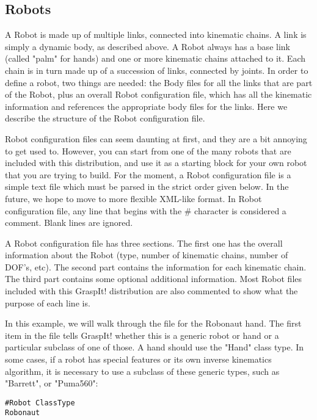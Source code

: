 \subsection{Robots}
\label{sec:robotfile}

A Robot is made up of multiple links, connected into kinematic
chains. A link is simply a dynamic body, as described above. A Robot
always has a base link (called "palm" for hands) and one or more
kinematic chains attached to it. Each chain is in turn made up of a
succession of links, connected by joints. In order to define a robot,
two things are needed: the Body files for all the links that are part
of the Robot, plus an overall Robot configuration file, which has all
the kinematic information and references the appropriate body files
for the links. Here we describe the structure of the Robot
configuration file.

Robot configuration files can seem daunting at first, and they are a
bit annoying to get used to. However, you can start from one of the
many robots that are included with this distribution, and use it as a
starting block for your own robot that you are trying to build. For
the moment, a Robot configuration file is a simple text file which
must be parsed in the strict order given below. In the future, we hope
to move to more flexible XML-like format. In Robot configuration file,
any line that begins with the \# character is considered a
comment. Blank lines are ignored.

A Robot configuration file has three sections. The first one has the
overall information about the Robot (type, number of kinematic chains,
number of DOF's, etc). The second part contains the information for
each kinematic chain. The third part contains some optional additional
information. Most Robot files included with this GraspIt! distribution
are also commented to show what the purpose of each line is.

In this example, we will walk through the file for the Robonaut
hand. The first item in the file tells GraspIt! whether this is a
generic robot or hand or a particular subclass of one of those. A hand
should use the "Hand" class type. In some cases, if a robot has
special features or its own inverse kinematics algorithm, it is
necessary to use a subclass of these generic types, such as "Barrett",
or "Puma560":

\begin{verbatim}
#Robot ClassType
Robonaut
\end{verbatim}

